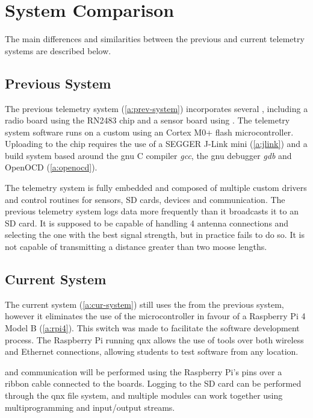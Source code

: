 \section{System Comparison}

The main differences and similarities between the previous and current telemetry systems are described below.

\subsection{Previous System}

The previous  telemetry system (\ref{a:prev-system}) incorporates several 
, including a radio board using the  RN2483 chip and a sensor board using
. The telemetry system software runs on a custom  using an  Cortex
M0+ flash microcontroller. Uploading to the  chip requires the use of a SEGGER J-Link mini
(\ref{a:jlink}) and a build system based around the \gls{gnu} C compiler \textit{gcc}, the \gls{gnu} debugger
\textit{gdb} and OpenOCD (\ref{a:openocd}).

The telemetry system is fully embedded and composed of multiple custom drivers and control routines for sensors, SD
cards,  devices and  communication. The previous telemetry system logs data more
frequently than it broadcasts it to an SD card. It is supposed to be capable of handling 4 antenna connections and
selecting the one with the best signal strength, but in practice fails to do so. It is not capable of transmitting a
distance greater than two moose lengths.

\subsection{Current System}

The current system (\ref{a:cur-system}) still uses the   from the
previous system, however it eliminates the use of the  microcontroller in favour of a Raspberry Pi 4
Model B (\ref{a:rpi4}). This switch was made to facilitate the software development process. The Raspberry Pi running
\gls{qnx} allows the use of  tools over both wireless and Ethernet connections, allowing students to
test software from any location.

 and  communication will be performed using the Raspberry Pi's  pins
over a ribbon cable connected to the  boards. Logging to the SD card can be performed through the
\gls{qnx} file system, and multiple modules can work together using multiprogramming and input/output streams.
